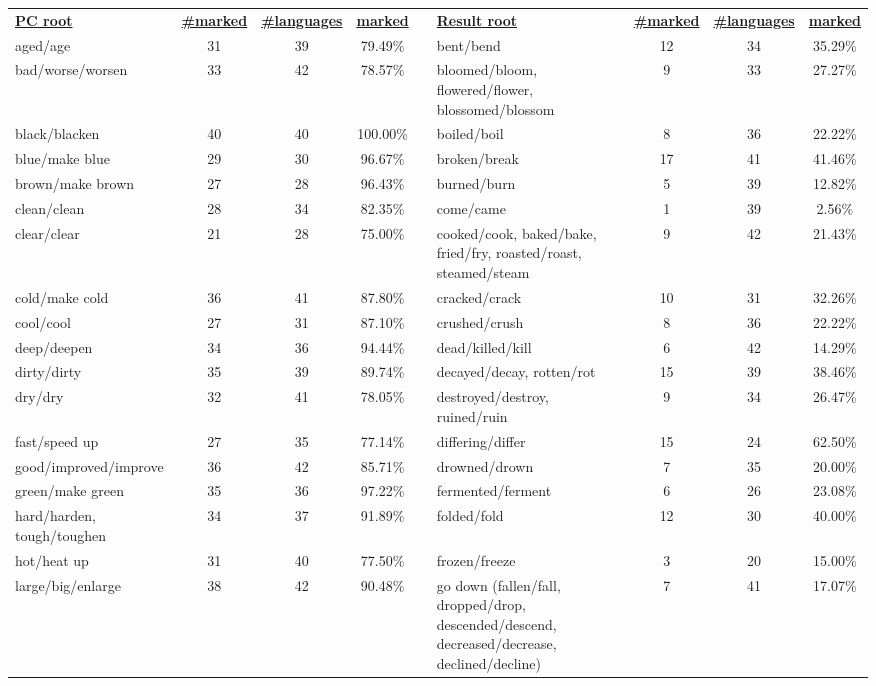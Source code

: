 \begin{tabular}{p{3cm}ccccp{3cm}ccc}
\underline{\textbf{PC root}} & \underline{\textbf{\#marked}} & \underline{\textbf{\#languages}} & \underline{\textbf{marked}} & & \underline{\textbf{Result root}} & \underline{\textbf{\#marked}} & \underline{\textbf{\#languages}} & \underline{\textbf{marked}} \\
aged/age & 31 & 39 & 79.49\% & & bent/bend & 12 & 34 & 35.29\% \\
bad/worse/worsen & 33 & 42 & 78.57\% & & bloomed/bloom, flowered/flower, blossomed/blossom & 9 & 33 & 27.27\% \\
black/blacken & 40 & 40 & 100.00\% & & boiled/boil & 8 & 36 & 22.22\% \\
blue/make blue & 29 & 30 & 96.67\% & & broken/break & 17 & 41 & 41.46\% \\
brown/make brown & 27 & 28 & 96.43\% & & burned/burn & 5 & 39 & 12.82\% \\
clean/clean & 28 & 34 & 82.35\% & & come/came & 1 & 39 & 2.56\% \\
clear/clear & 21 & 28 & 75.00\% & & cooked/cook, baked/bake, fried/fry, roasted/roast, steamed/steam & 9 & 42 & 21.43\% \\
cold/make cold & 36 & 41 & 87.80\% & & cracked/crack & 10 & 31 & 32.26\% \\
cool/cool & 27 & 31 & 87.10\% & & crushed/crush & 8 & 36 & 22.22\% \\
deep/deepen & 34 & 36 & 94.44\% & & dead/killed/kill & 6 & 42 & 14.29\% \\
dirty/dirty & 35 & 39 & 89.74\% & & decayed/decay, rotten/rot & 15 & 39 & 38.46\% \\
dry/dry & 32 & 41 & 78.05\% & & destroyed/destroy, ruined/ruin & 9 & 34 & 26.47\% \\
fast/speed up & 27 & 35 & 77.14\% & & differing/differ & 15 & 24 & 62.50\% \\
good/improved/improve & 36 & 42 & 85.71\% & & drowned/drown & 7 & 35 & 20.00\% \\
green/make green & 35 & 36 & 97.22\% & & fermented/ferment & 6 & 26 & 23.08\% \\
hard/harden, tough/toughen & 34 & 37 & 91.89\% & & folded/fold & 12 & 30 & 40.00\% \\
hot/heat up & 31 & 40 & 77.50\% & & frozen/freeze & 3 & 20 & 15.00\% \\
large/big/enlarge & 38 & 42 & 90.48\% & & go down (fallen/fall, dropped/drop, descended/descend, decreased/decrease, declined/decline) & 7 & 41 & 17.07\% \\

\end{tabular}
